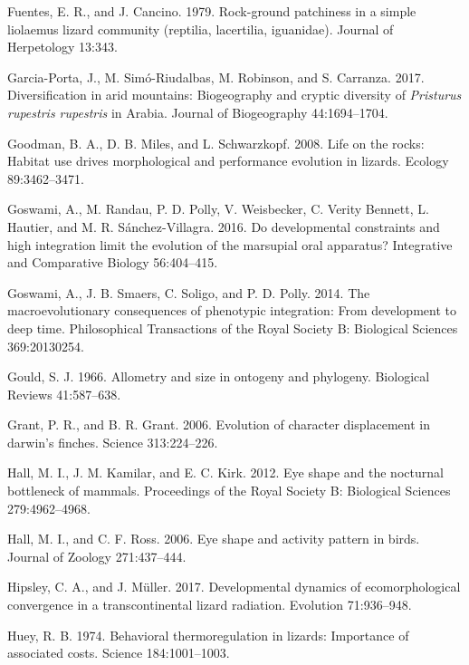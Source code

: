 \documentclass[
  11pt,
]{article}
\begin{document}
\leavevmode\hypertarget{ref-Fuentes1979}{}%
Fuentes, E. R., and J. Cancino. 1979. Rock-ground patchiness in a simple
liolaemus lizard community (reptilia, lacertilia, iguanidae). Journal of
Herpetology 13:343.

\leavevmode\hypertarget{ref-Garcia-Porta2017}{}%
Garcia-Porta, J., M. Simó-Riudalbas, M. Robinson, and S. Carranza. 2017.
Diversification in arid mountains: Biogeography and cryptic diversity of
\emph{Pristurus rupestris rupestris} in Arabia. Journal of Biogeography
44:1694--1704.

\leavevmode\hypertarget{ref-Goodman2008}{}%
Goodman, B. A., D. B. Miles, and L. Schwarzkopf. 2008. Life on the
rocks: Habitat use drives morphological and performance evolution in
lizards. Ecology 89:3462--3471.

\leavevmode\hypertarget{ref-Goswami2016}{}%
Goswami, A., M. Randau, P. D. Polly, V. Weisbecker, C. Verity Bennett,
L. Hautier, and M. R. Sánchez-Villagra. 2016. Do developmental
constraints and high integration limit the evolution of the marsupial
oral apparatus? Integrative and Comparative Biology 56:404--415.

\leavevmode\hypertarget{ref-Goswami2014}{}%
Goswami, A., J. B. Smaers, C. Soligo, and P. D. Polly. 2014. The
macroevolutionary consequences of phenotypic integration: From
development to deep time. Philosophical Transactions of the Royal
Society B: Biological Sciences 369:20130254.

\leavevmode\hypertarget{ref-GOULD1966}{}%
Gould, S. J. 1966. Allometry and size in ontogeny and phylogeny.
Biological Reviews 41:587--638.

\leavevmode\hypertarget{ref-Grant2006}{}%
Grant, P. R., and B. R. Grant. 2006. Evolution of character displacement
in darwin's finches. Science 313:224--226.

\leavevmode\hypertarget{ref-Hall2012}{}%
Hall, M. I., J. M. Kamilar, and E. C. Kirk. 2012. Eye shape and the
nocturnal bottleneck of mammals. Proceedings of the Royal Society B:
Biological Sciences 279:4962--4968.

\leavevmode\hypertarget{ref-Hall2006}{}%
Hall, M. I., and C. F. Ross. 2006. Eye shape and activity pattern in
birds. Journal of Zoology 271:437--444.

\leavevmode\hypertarget{ref-HipsleyMuller2017}{}%
Hipsley, C. A., and J. Müller. 2017. Developmental dynamics of
ecomorphological convergence in a transcontinental lizard radiation.
Evolution 71:936--948.

\leavevmode\hypertarget{ref-Huey1974}{}%
Huey, R. B. 1974. Behavioral thermoregulation in lizards: Importance of
associated costs. Science 184:1001--1003.
\end{document}
